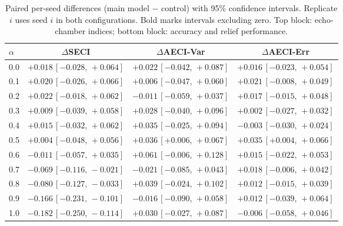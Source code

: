 \documentclass[pdflatex,sn-basic]{sn-jnl}
\begin{document}
\begin{table}[h]
\caption{Paired per-seed differences (main model $-$ control) with 95\% confidence intervals. Replicate $i$ uses seed $i$ in both configurations. Bold marks intervals excluding zero. Top block: echo-chamber indices; bottom block: accuracy and relief performance.}\label{tab:deltas}
\footnotesize
\setlength{\tabcolsep}{4pt}
\begin{tabular}{@{}lccc@{}}
\toprule
$\alpha$ & $\Delta$SECI & $\Delta$AECI-Var & $\Delta$AECI-Err \\
\midrule
0.0 & $+0.018\,[-0.028,\,+0.064]$ & $+0.022\,[-0.042,\,+0.087]$ & $+0.016\,[-0.023,\,+0.054]$ \\
0.1 & $+0.020\,[-0.026,\,+0.066]$ & $+0.006\,[-0.047,\,+0.060]$ & $+0.021\,[-0.008,\,+0.049]$ \\
0.2 & $+0.022\,[-0.018,\,+0.062]$ & $-0.011\,[-0.059,\,+0.037]$ & $+0.017\,[-0.015,\,+0.048]$ \\
0.3 & $+0.009\,[-0.039,\,+0.058]$ & $+0.028\,[-0.040,\,+0.096]$ & $+0.002\,[-0.027,\,+0.032]$ \\
0.4 & $+0.015\,[-0.032,\,+0.062]$ & $+0.035\,[-0.025,\,+0.094]$ & $-0.003\,[-0.030,\,+0.024]$ \\
0.5 & $+0.004\,[-0.048,\,+0.056]$ & $\mathbf{+0.036}\,[+0.006,\,+0.067]$ & $\mathbf{+0.035}\,[+0.004,\,+0.066]$ \\
0.6 & $-0.011\,[-0.057,\,+0.035]$ & $+0.061\,[-0.006,\,+0.128]$ & $+0.015\,[-0.022,\,+0.053]$ \\
0.7 & $\mathbf{-0.069}\,[-0.116,\,-0.021]$ & $-0.021\,[-0.085,\,+0.043]$ & $+0.018\,[-0.006,\,+0.042]$ \\
0.8 & $\mathbf{-0.080}\,[-0.127,\,-0.033]$ & $+0.039\,[-0.024,\,+0.102]$ & $+0.012\,[-0.015,\,+0.039]$ \\
0.9 & $\mathbf{-0.166}\,[-0.231,\,-0.101]$ & $-0.016\,[-0.090,\,+0.058]$ & $+0.012\,[-0.039,\,+0.064]$ \\
1.0 & $\mathbf{-0.182}\,[-0.250,\,-0.114]$ & $+0.030\,[-0.027,\,+0.087]$ & $-0.006\,[-0.058,\,+0.046]$ \\

\end{tabular}
\end{table}
\end{document}
